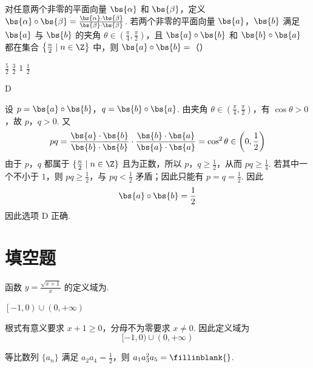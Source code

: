 \begin{problem}
对任意两个非零的平面向量 \(\bs{\alpha}\) 和 \(\bs{\beta}\)，定义 \(\bs{\alpha} \circ \bs{\beta} = \frac{\bs{\alpha} \cdot \bs{\beta}}{\bs{\beta} \cdot \bs{\beta}}\). 若两个非零的平面向量 \(\bs{a}\)，\(\bs{b}\) 满足 \(\bs{a}\) 与 \(\bs{b}\) 的夹角 \(\theta \in \left(\frac{\pi}{4}, \frac{\pi}{2}\right)\)，且 \(\bs{a} \circ \bs{b}\) 和 \(\bs{b} \circ \bs{a}\) 都在集合 \(\left\{\frac{n}{2} \mid n \in \Z\right\}\) 中，则 \(\bs{a} \circ \bs{b} =\)（\quad）

\choices
    {\(\frac{5}{2}\)}
    {\(\frac{3}{2}\)}
    {\(1\)}
    {\(\frac{1}{2}\)}
\end{problem}

\begin{answer}
D
\end{answer}

\begin{solution}
设
\(p=\bs{a}\circ\bs{b}\)，\(q=\bs{b}\circ\bs{a}\).
由夹角 \(\theta\in(\frac{\pi}{4},\frac{\pi}{2})\)，有 \(\cos\theta>0\)，故 \(p\)，\(q>0\). 又
\[
pq=\frac{\bs{a}\cdot\bs{b}}{\bs{b}\cdot\bs{b}}
\cdot
\frac{\bs{b}\cdot\bs{a}}{\bs{a}\cdot\bs{a}}=\cos^2\theta\in\left(0,\frac12\right)
\]
由于 \(p\)，\(q\) 都属于 \(\{\frac{n}{2}\mid n\in\Z\}\) 且为正数，所以 \(p\)，\(q\geqslant\frac{1}{2}\)，从而 \(pq\geqslant\frac{1}{4}\). 若其中一个不小于 \(1\)，则 \(pq\geqslant\frac{1}{2}\)，与 \(pq<\frac{1}{2}\) 矛盾；因此只能有 \(p=q=\frac{1}{2}\). 因此
\[
\bs{a}\circ\bs{b}=\frac12
\]
因此选项 D 正确.
\end{solution}

\section{填空题}

\begin{problem}
函数 \( y = \frac{\sqrt{x + 1}}{x} \) 的定义域为\fillinblank{}.
\end{problem}

\begin{answer}
\(\left[-1, 0\right) \cup \left(0, +\infty\right)\)
\end{answer}

\begin{solution}
根式有意义要求 \(x+1\geqslant0\)，分母不为零要求 \(x\ne0\). 因此定义域为
\[
[-1,0)\cup(0,+\infty)
\]
\end{solution}

\begin{problem}
等比数列 \(\{a_{n}\}\) 满足 \(a_{2}a_{4} = \frac{1}{2}\)，则 \(a_{1}a_{3}^{2}a_{5} =\fillinblank{}\).
\end{problem}

